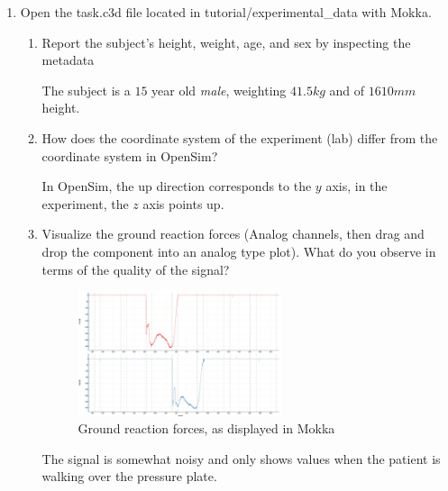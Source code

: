 \documentclass[11pt]{article}
\begin{document}
\begin{enumerate}
\begin{adjustwidth}{0.5cm}{}
\begin{figure}[h!]
            \caption{Plot of moments in the ankle for both flexed and straight knee.}
        \end{figure}
        When the knee is flexed, the ankle is subject to much more intense moments than when it is straight as can be show in OpenSim by plotting the straight and flexed ($90\degree$) knee moments together.
    \end{adjustwidth}
    \item Open the task.c3d file located in tutorial/experimental\_data with Mokka.
    \begin{enumerate}
        \item Report the subject's height, weight, age, and sex by inspecting the metadata
        \begin{adjustwidth}{0.5cm}{}
            The subject is a $15$ year old \textit{male}, weighting $41.5kg$ and of $1610mm$ height.
        \end{adjustwidth}
        \item How does the coordinate system of the experiment (lab) differ from the coordinate
        system in OpenSim?
        \begin{adjustwidth}{0.5cm}{}
            In OpenSim, the up direction corresponds to the $y$ axis, in the experiment, the $z$ axis points up.
        \end{adjustwidth}
        \item Visualize the ground reaction forces (Analog channels, then drag and drop the
        component into an analog type plot). What do you observe in terms of the quality of
        the signal?
        \begin{adjustwidth}{0.5cm}{}
            \begin{figure}[h!]
                \centering
                \includegraphics[width=0.6\textwidth]{screens/ground_reaction.png}
                \caption{Ground reaction forces, as displayed in Mokka}
            \end{figure}
            The signal is somewhat noisy and only shows values when the patient is walking over the pressure plate.

\end{adjustwidth}
\end{enumerate}
\end{enumerate}
\end{document}
